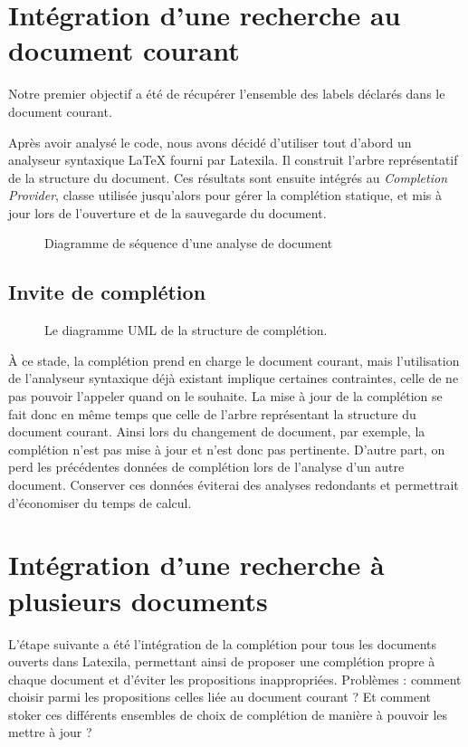 \documentclass[a4paper,11pt]{report}
\begin{document}
\section{Intégration d'une recherche au document courant}
Notre premier objectif a été de récupérer l'ensemble des labels déclarés dans le document courant.

Après avoir analysé le code, nous avons décidé d'utiliser tout d'abord un analyseur syntaxique \LaTeX{} fourni par Latexila. Il construit l'arbre représentatif de la structure du document.
Ces résultats sont ensuite intégrés au \textit{Completion Provider}, classe utilisée jusqu'alors pour gérer la complétion statique, et mis à jour lors de l'ouverture et de la sauvegarde du document.

\begin{figure}[h]
\label{fig:doc_opening}
\centering

\caption{Diagramme de séquence d'une analyse de document}
\end{figure}

\subsection{Invite de complétion}
\begin{figure}[h!]
\label{fig:uml_completion_structure}
\centering

\caption{Le diagramme UML de la structure de complétion.}
\end{figure}

À ce stade, la complétion prend en charge le document courant, mais l'utilisation de l'analyseur syntaxique déjà existant implique certaines contraintes, celle de ne pas pouvoir l'appeler quand on le souhaite.
La mise à jour de la complétion se fait donc en même temps que celle de l'arbre représentant la structure du document courant. 
Ainsi lors du changement de document, par exemple, la complétion n'est pas mise à jour et n'est donc pas pertinente.
D'autre part, on perd les précédentes données de complétion lors de l'analyse d'un autre document.
Conserver ces données éviterai des analyses redondants et permettrait d'économiser du temps de calcul.

\section{Intégration d'une recherche à plusieurs documents}
L'étape suivante a été l'intégration de la complétion pour tous les documents ouverts dans Latexila, permettant ainsi de proposer une complétion propre à chaque document et d'éviter les propositions inappropriées.
Problèmes : comment choisir parmi les propositions celles liée au document courant ? Et comment stoker ces différents ensembles de choix de complétion de manière à pouvoir les mettre à jour ?
\end{document}
